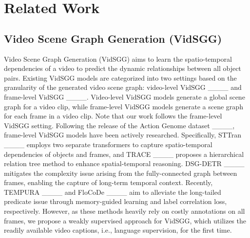 \section{Related Work}
\label{sec:related_work}
\vspace{-1.5ex}
\subsection{Video Scene Graph Generation (VidSGG)} 
\vspace{-1ex}
Video Scene Graph Generation (VidSGG) aims to learn the spatio-temporal dependencies of a video to predict the dynamic relationships between all object pairs. Existing VidSGG models are categorized into two settings based on the granularity of the generated video scene graph: video-level VidSGG ____ and frame-level VidSGG ____. 
Video-level VidSGG models generate a global scene graph for a video clip, while frame-level VidSGG models generate a scene graph for each frame in a video clip. Note that our work follows the frame-level VidSGG setting.
Following the release of the Action Genome dataset ____, frame-level VidSGG models have been actively researched. Specifically, STTran ____ employs two separate transformers to capture spatio-temporal dependencies of objects and frames, and TRACE ____ proposes a hierarchical relation tree method to enhance spatial-temporal reasoning. DSG-DETR ____ mitigates the complexity issue arising from the fully-connected graph between frames, enabling the capture of long-term temporal context. {Recently, TEMPURA ____ and FloCoDe ____ aim to alleviate the long-tailed predicate issue through memory-guided learning and label correlation loss, respectively.} However, as these methods heavily rely on costly annotations on all frames, we propose a weakly supervised approach for VidSGG, which utilizes the readily available video captions, i.e., language supervision, for the first time.





